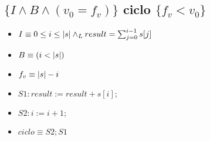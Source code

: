 \documentclass{article}
\begin{document}
\subsection*{$\{I \wedge B \wedge (v_{0} = f_{v})\}$ ciclo $\{f_{v} < v_{0}\}$}

\begin{itemize}
    \item $I \equiv 0 \leq i \leq |s| \land _L result = \sum_{j=0}^{i-1} s[j]$
    \item $B \equiv (i < |s|)$
    \item $f_{v} \equiv |s|-i$
    \item $S1: result := result + s[i];$
    \item $S2: i := i + 1;$
    \item $ciclo \equiv S2; S1$
\end{itemize}
\end{document}
